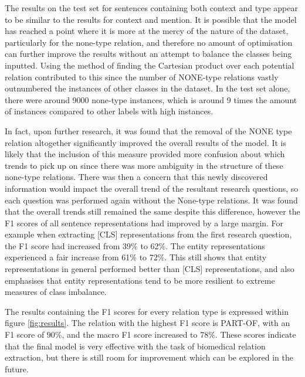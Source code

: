 \documentclass{l4proj}
\begin{document}
The results on the test set for sentences containing both context and type appear to be similar to the results for context and mention. It is possible that the model has reached a point where it is more at the mercy of the nature of the dataset, particularly for the none-type relation, and therefore no amount of optimisation can further improve the results without an attempt to balance the classes being inputted. Using the method of finding the Cartesian product over each potential relation contributed to this since the number of NONE-type relations vastly outnumbered the instances of other classes in the dataset. In the test set alone, there were around 9000 none-type instances, which is around 9 times the amount of instances compared to other labels with high instances.

In fact, upon further research, it was found that the removal of the NONE type relation altogether significantly improved the overall results of the model. It is likely that the inclusion of this measure provided more confusion about which trends to pick up on since there was more ambiguity in the structure of these none-type relations. There was then a concern that this newly discovered information would impact the overall trend of the resultant research questions, so each question was performed again without the None-type relations. It was found that the overall trends still remained the same despite this difference, however the F1 scores of all sentence representations had improved by a large margin. For example when extracting [CLS] representations from the first research question, the F1 score had increased from 39\% to 62\%. The entity representations experienced a fair increase from 61\% to 72\%. This still shows that entity representations in general performed better than [CLS] representations, and also emphasises that entity representations tend to be more resilient to extreme measures of class imbalance.

The results containing the F1 scores for every relation type is expressed within figure \ref{fig:results}. The relation with the highest F1 score is PART-OF, with an F1 score of 90\%, and the macro F1 score increased to 78\%. These scores indicate that the final model is very effective with the task of biomedical relation extraction, but there is still room for improvement which can be explored in the future.
\end{document}

